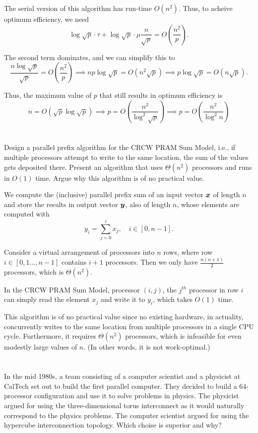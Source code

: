 \documentclass{article}
\begin{document}
\begin{enumerate}
  The serial version of this algorithm has run-time $O(n^2)$.
  Thus, to acheive optimum efficiency, we need
  $$\log{\sqrt{p}} \cdot \tau + \log{\sqrt{p}}\cdot \mu\frac{n}{\sqrt{p}} = O\left(\dfrac{n^2}{p}\right).$$
  
  The second term dominates, and we can simplify this to
  $$\frac{n\log{\sqrt{p}}}{\sqrt{p}} = O\left(\dfrac{n^2}{p}\right) \implies np\log{\sqrt{p}} = O(n^2\sqrt{p}) \implies  p\log{\sqrt{p}} = O(n\sqrt{p}).$$

  Thus, the maximum value of $p$ that still results in optimum efficiency is
  $$n = O\left(\sqrt{p}\log{\sqrt{p}}\right) \implies p = O(\dfrac{n^2}{\log^2{\sqrt{p}}}) \implies p = O\left(\dfrac{n^2}{\log^2{n}}\right)$$

\end{enumerate}

\section{}
Design a parallel prefix algorithm for the CRCW PRAM Sum Model, i.e., if multiple processors attempt to write to the same location, the sum of the values gets deposited there.
Present an algorithm that uses $\Theta(n^2)$ processors and runs in $O(1)$ time.
Argue why this algorithm is of no practical value.

\quad We compute the (inclusive) parallel prefix sum of an input vector $\bm{x}$ of length $n$ and store the results in output vector $\bm{y}$, also of length $n$, whose elements are computed with
$$y_i = \sum\limits_{j=0}^{i}{x_j},\quad i \in [0, n - 1].$$

Consider a virtual arrangement of processors into $n$ rows, where row $i \in [0, 1 \dots, n - 1]$ contains $i + 1$ processors.
Then we only have $\frac{n(n+1)}{2}$ processors, which is $\Theta(n^2)$.

In the CRCW PRAM Sum Model, processor $(i, j)$, the $j^{th}$ processor in row $i$ can simply read the element $x_j$ and write it to $y_i$, which takes $O(1)$ time.

This algorithm is of no practical value since no existing hardware, in actuality, concurrently writes to the same location from multiple processors in a single CPU cycle.
Furthermore, it requires $\Theta(n^2)$ processors, which is infeasible for even modestly large values of $n$.
(In other words, it is not work-optimal.)

\section{}
In the mid 1980s, a team consisting of a computer scientist and a physicist at CalTech set out to build the first parallel computer.
They decided to build a 64-processor configuration and use it to solve problems in physics.
The physicist argued for using the three-dimensional torus interconnect as it would naturally correspond to the physics problems.
The computer scientist argued for using the hypercube interconnection topology.
Which choise is superior and why?
\end{document}
